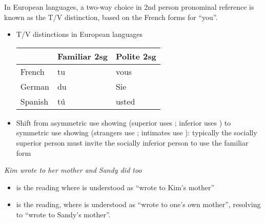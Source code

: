 \documentclass[headrule,footrule]{foils}
\begin{document}

In European languages, a two-way choice in 2nd person pronominal
reference is known as the T/V distinction, based on the French forms
for ``you''.

\begin{itemize}
\item T/V distinctions in European languages
\\[2ex]  \begin{tabular}{lll}
    & Familiar 2sg & Polite 2sg \\ \hline
    French & tu & vous \\
    German & du & Sie \\
    Spanish & t\'u & usted
  \end{tabular}

\item Shift from asymmetric use showing  (superior uses ; inferior uses ) to symmetric use showing  (strangers use  ; intimates use ): typically the socially superior person must invite the socially
  inferior person to use the familiar form
\end{itemize}


\MyLogo{}
\begin{exe}
  \ex \textit{Kim wrote to her mother and Sandy did too}
\end{exe}
\begin{itemize}
\item {} is the reading where 
  is understood as ``wrote to Kim's mother''
\item {}  is the reading, where 
  is understood as ``wrote to one's own mother'',
  resolving to ``wrote to Sandy's mother''.
\end{itemize}
\end{document}
